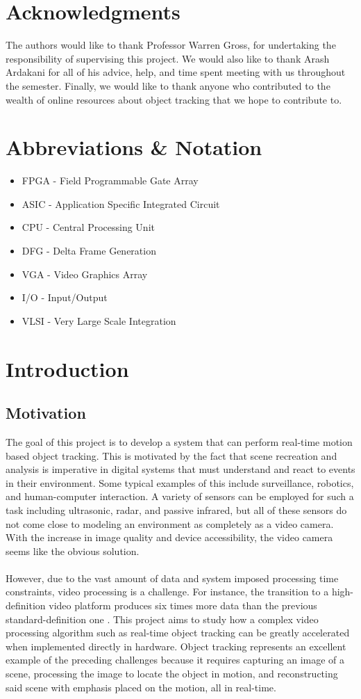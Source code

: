 \documentclass[11pt]{article} %
\begin{document}
\section*{Acknowledgments}
The authors would like to thank Professor Warren Gross, for undertaking the responsibility of supervising this project. We would also like to thank Arash Ardakani for all of his advice, help, and time spent meeting with us throughout the semester. Finally, we would like to thank anyone who contributed to the wealth of online resources about object tracking that we hope to contribute to.
\pagebreak
\tableofcontents
\pagebreak
\section{Abbreviations \& Notation}
\begin{itemize}
\item[] FPGA - Field Programmable Gate Array
\item[] ASIC - Application Specific Integrated Circuit
\item[] CPU - Central Processing Unit
\item[] DFG - Delta Frame Generation
\item[] VGA - Video Graphics Array
\item[] I/O - Input/Output
\item[] VLSI - Very Large Scale Integration
\end{itemize}
\section{Introduction}
\label{sec:intro}
\subsection{Motivation}
The goal of this project is to develop a system that can perform real-time motion based object tracking. This is motivated by the fact that scene recreation and analysis is imperative in digital systems that must understand and react to events in their environment. Some typical examples of this include surveillance, robotics, and human-computer interaction. A variety of sensors can be employed for such a task including ultrasonic, radar, and passive infrared, but all of these sensors do not come close to modeling an environment as completely as a video camera. With the increase in image quality and device accessibility, the video camera seems like the obvious solution. \\\\
However, due to the vast amount of data and system imposed processing time constraints, video processing is a challenge. For instance, the transition to a high-definition video platform produces six times more data than the previous standard-definition one \cite{3}. This project aims to study how a complex video processing algorithm such as real-time object tracking can be greatly accelerated when implemented directly in hardware. Object tracking represents an excellent example of the preceding challenges because it requires capturing an image of a scene, processing the image to locate the object in motion, and reconstructing said scene with emphasis placed on the motion, all in real-time.
\end{document}
